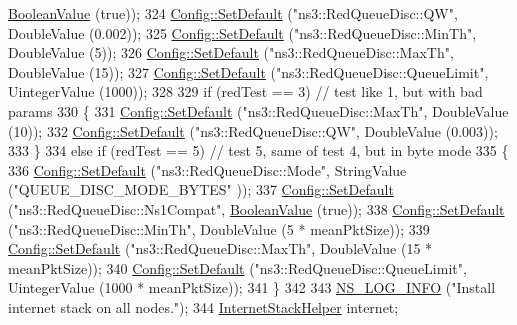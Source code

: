 \begin{DoxyCode}
      \hyperlink{classns3_1_1BooleanValue}{BooleanValue} (\textcolor{keyword}{true}));
324   \hyperlink{group__config_ga2e7882df849d8ba4aaad31c934c40c06}{Config::SetDefault} (\textcolor{stringliteral}{"ns3::RedQueueDisc::QW"}, DoubleValue (0.002));
325   \hyperlink{group__config_ga2e7882df849d8ba4aaad31c934c40c06}{Config::SetDefault} (\textcolor{stringliteral}{"ns3::RedQueueDisc::MinTh"}, DoubleValue (5));
326   \hyperlink{group__config_ga2e7882df849d8ba4aaad31c934c40c06}{Config::SetDefault} (\textcolor{stringliteral}{"ns3::RedQueueDisc::MaxTh"}, DoubleValue (15));
327   \hyperlink{group__config_ga2e7882df849d8ba4aaad31c934c40c06}{Config::SetDefault} (\textcolor{stringliteral}{"ns3::RedQueueDisc::QueueLimit"}, UintegerValue (1000));
328 
329   \textcolor{keywordflow}{if} (redTest == 3) \textcolor{comment}{// test like 1, but with bad params}
330     \{
331       \hyperlink{group__config_ga2e7882df849d8ba4aaad31c934c40c06}{Config::SetDefault} (\textcolor{stringliteral}{"ns3::RedQueueDisc::MaxTh"}, DoubleValue (10));
332       \hyperlink{group__config_ga2e7882df849d8ba4aaad31c934c40c06}{Config::SetDefault} (\textcolor{stringliteral}{"ns3::RedQueueDisc::QW"}, DoubleValue (0.003));
333     \}
334   \textcolor{keywordflow}{else} \textcolor{keywordflow}{if} (redTest == 5) \textcolor{comment}{// test 5, same of test 4, but in byte mode}
335     \{
336       \hyperlink{group__config_ga2e7882df849d8ba4aaad31c934c40c06}{Config::SetDefault} (\textcolor{stringliteral}{"ns3::RedQueueDisc::Mode"}, StringValue (\textcolor{stringliteral}{"QUEUE\_DISC\_MODE\_BYTES"}
      ));
337       \hyperlink{group__config_ga2e7882df849d8ba4aaad31c934c40c06}{Config::SetDefault} (\textcolor{stringliteral}{"ns3::RedQueueDisc::Ns1Compat"}, 
      \hyperlink{classns3_1_1BooleanValue}{BooleanValue} (\textcolor{keyword}{true}));
338       \hyperlink{group__config_ga2e7882df849d8ba4aaad31c934c40c06}{Config::SetDefault} (\textcolor{stringliteral}{"ns3::RedQueueDisc::MinTh"}, DoubleValue (5 * meanPktSize));
339       \hyperlink{group__config_ga2e7882df849d8ba4aaad31c934c40c06}{Config::SetDefault} (\textcolor{stringliteral}{"ns3::RedQueueDisc::MaxTh"}, DoubleValue (15 * meanPktSize));
340       \hyperlink{group__config_ga2e7882df849d8ba4aaad31c934c40c06}{Config::SetDefault} (\textcolor{stringliteral}{"ns3::RedQueueDisc::QueueLimit"}, UintegerValue (1000 * 
      meanPktSize));
341     \}
342 
343   \hyperlink{group__logging_gafbd73ee2cf9f26b319f49086d8e860fb}{NS\_LOG\_INFO} (\textcolor{stringliteral}{"Install internet stack on all nodes."});
344   \hyperlink{classns3_1_1InternetStackHelper}{InternetStackHelper} internet;

\end{DoxyCode}
